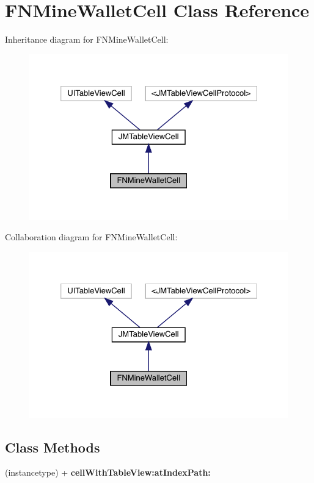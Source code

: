 \hypertarget{interface_f_n_mine_wallet_cell}{}\section{F\+N\+Mine\+Wallet\+Cell Class Reference}
\label{interface_f_n_mine_wallet_cell}


Inheritance diagram for F\+N\+Mine\+Wallet\+Cell\+:\nopagebreak
\begin{figure}[H]
\begin{center}
\leavevmode
\includegraphics[width=326pt]{interface_f_n_mine_wallet_cell__inherit__graph}
\end{center}
\end{figure}


Collaboration diagram for F\+N\+Mine\+Wallet\+Cell\+:\nopagebreak
\begin{figure}[H]
\begin{center}
\leavevmode
\includegraphics[width=326pt]{interface_f_n_mine_wallet_cell__coll__graph}
\end{center}
\end{figure}
\subsection*{Class Methods}
\begin{DoxyCompactItemize}
\item 
\mbox{\label{interface_f_n_mine_wallet_cell_a9b31a0f0c8c97245e3bddb6db5c30c85}} 
(instancetype) + {\bfseries cell\+With\+Table\+View\+:at\+Index\+Path\+:}
\end{DoxyCompactItemize}
